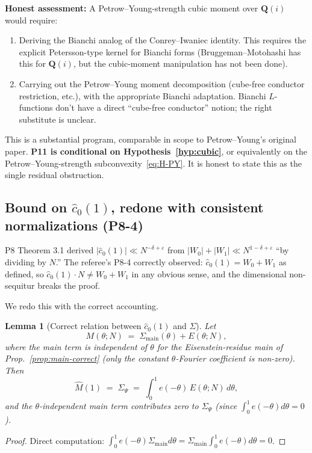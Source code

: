\documentclass[11pt]{article}
\newtheorem{lemma}[theorem]{Lemma}
\theoremstyle{definition}
\newcommand{\Q}{\mathbf{Q}}
\begin{document}
\textbf{Honest assessment:} A Petrow--Young-strength cubic moment over $\Q(i)$ would require:
\begin{enumerate}[label=(\roman*)]
\item Deriving the Bianchi analog of the Conrey--Iwaniec identity. This requires the explicit Petersson-type kernel for Bianchi forms (Bruggeman--Motohashi has this for $\Q(i)$, but the cubic-moment manipulation has not been done).
\item Carrying out the Petrow--Young moment decomposition (cube-free conductor restriction, etc.), with the appropriate Bianchi adaptation. Bianchi $L$-functions don't have a direct ``cube-free conductor'' notion; the right substitute is unclear.
\end{enumerate}

This is a substantial program, comparable in scope to Petrow--Young's original paper. \textbf{P11 is conditional on Hypothesis~\ref{hyp:cubic}}, or equivalently on the Petrow--Young-strength subconvexity~\eqref{eq:H-PY}. It is honest to state this as the single residual obstruction.

\subsection{Bound on $\widehat c_0(1)$, redone with consistent normalizations (P8-4)}\label{sec:c0-redone}

P8 Theorem 3.1 derived $|\widehat c_0(1)|\ll N^{-\delta+\varepsilon}$ from $|W_0|+|W_1|\ll N^{1-\delta+\varepsilon}$ ``by dividing by $N$.'' The referee's P8-4 correctly observed: $\widehat c_0(1)=W_0+W_1$ as defined, so $\widehat c_0(1)\cdot N\ne W_0+W_1$ in any obvious sense, and the dimensional non-sequitur breaks the proof.

We redo this with the correct accounting.

\begin{lemma}[Correct relation between $\widehat c_0(1)$ and $\Sigma$]\label{lem:c0-Sigma}
Let
\[
M(\theta;N)\;=\;\Sigma_{\mathrm{main}}(\theta)+E(\theta;N),
\]
where the main term is independent of $\theta$ for the Eisenstein-residue main of Prop.~\ref{prop:main-correct} (only the constant $\theta$-Fourier coefficient is non-zero). Then
\[
\widehat M(1)\;=\;\Sigma_\Psi\;=\;\int_0^1 e(-\theta)\,E(\theta;N)\,d\theta,
\]
and the $\theta$-independent main term contributes \emph{zero} to $\Sigma_\Psi$ (since $\int_0^1 e(-\theta)d\theta=0$).
\end{lemma}

\begin{proof}
Direct computation: $\int_0^1 e(-\theta)\Sigma_{\mathrm{main}}d\theta=\Sigma_{\mathrm{main}}\int_0^1 e(-\theta)d\theta=0$.
\end{proof}
\end{document}

